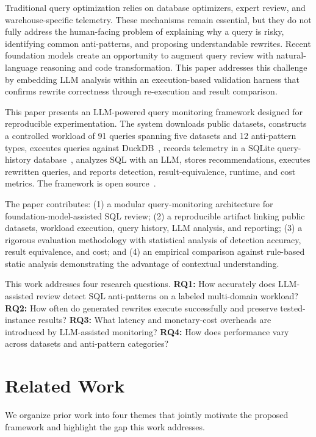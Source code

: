 \documentclass[conference]{IEEEtran}
\begin{document}
Traditional query optimization relies on database optimizers, expert review, and warehouse-specific telemetry. These mechanisms remain essential, but they do not fully address the human-facing problem of explaining why a query is risky, identifying common anti-patterns, and proposing understandable rewrites. Recent foundation models create an opportunity to augment query review with natural-language reasoning and code transformation. This paper addresses this challenge by embedding LLM analysis within an execution-based validation harness that confirms rewrite correctness through re-execution and result comparison.

This paper presents an LLM-powered query monitoring framework designed for reproducible experimentation. The system downloads public datasets, constructs a controlled workload of 91 queries spanning five datasets and 12 anti-pattern types, executes queries against DuckDB~\cite{raasveldt2020duckdb}, records telemetry in a SQLite query-history database~\cite{sqlite2026}, analyzes SQL with an LLM, stores recommendations, executes rewritten queries, and reports detection, result-equivalence, runtime, and cost metrics. The framework is open source~\cite{sharma2026framework}.

The paper contributes: (1) a modular query-monitoring architecture for foundation-model-assisted SQL review; (2) a reproducible artifact linking public datasets, workload execution, query history, LLM analysis, and reporting; (3) a rigorous evaluation methodology with statistical analysis of detection accuracy, result equivalence, and cost; and (4) an empirical comparison against rule-based static analysis demonstrating the advantage of contextual understanding.

This work addresses four research questions. \textbf{RQ1:} How accurately does LLM-assisted review detect SQL anti-patterns on a labeled multi-domain workload? \textbf{RQ2:} How often do generated rewrites execute successfully and preserve tested-instance results? \textbf{RQ3:} What latency and monetary-cost overheads are introduced by LLM-assisted monitoring? \textbf{RQ4:} How does performance vary across datasets and anti-pattern categories?

\section{Related Work}
We organize prior work into four themes that jointly motivate the proposed framework and highlight the gap this work addresses.
\end{document}
